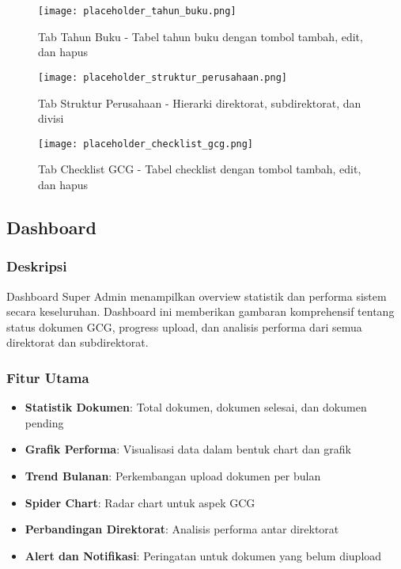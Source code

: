 \documentclass[12pt,a4paper]{article}
\begin{document}
\begin{figure}[H]
\centering
\texttt{[image: placeholder\_tahun\_buku.png]}
\caption{Tab Tahun Buku - Tabel tahun buku dengan tombol tambah, edit, dan hapus}
\label{fig:tahun_buku}
\end{figure}

\begin{figure}[H]
\centering
\texttt{[image: placeholder\_struktur\_perusahaan.png]}
\caption{Tab Struktur Perusahaan - Hierarki direktorat, subdirektorat, dan divisi}
\label{fig:struktur_perusahaan}
\end{figure}

\begin{figure}[H]
\centering
\texttt{[image: placeholder\_checklist\_gcg.png]}
\caption{Tab Checklist GCG - Tabel checklist dengan tombol tambah, edit, dan hapus}
\label{fig:checklist_gcg}
\end{figure}

\subsection{Dashboard}

\subsubsection{Deskripsi}
Dashboard Super Admin menampilkan overview statistik dan performa sistem secara keseluruhan. Dashboard ini memberikan gambaran komprehensif tentang status dokumen GCG, progress upload, dan analisis performa dari semua direktorat dan subdirektorat.

\subsubsection{Fitur Utama}
\begin{itemize}
\item \textbf{Statistik Dokumen}: Total dokumen, dokumen selesai, dan dokumen pending
\item \textbf{Grafik Performa}: Visualisasi data dalam bentuk chart dan grafik
\item \textbf{Trend Bulanan}: Perkembangan upload dokumen per bulan
\item \textbf{Spider Chart}: Radar chart untuk aspek GCG
\item \textbf{Perbandingan Direktorat}: Analisis performa antar direktorat
\item \textbf{Alert dan Notifikasi}: Peringatan untuk dokumen yang belum diupload
\end{itemize}
\end{document}
